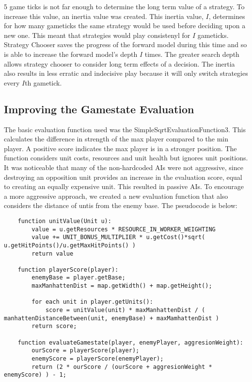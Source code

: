 \documentclass[]{article}
\begin{document}
5 game ticks is not far enough to determine the long term value of a strategy. To increase this value, an inertia value was created. This inertia value, $I$, determines for how many gameticks the same strategy would be used before deciding upon a new one. This meant that strategies would play consistenyl for $I$ gameticks. Strategy Chooser saves the progress of the forward model during this time and so is able to increase the forward model's depth $I$ times. The greater search depth allows strategy chooser to consider long term effects of a decision. The inertia also results in less erratic and indecisive play because it will only switch strategies every $I$th gametick. 

\subsection{Improving the Gamestate Evaluation}
The basic evaluation function used was the SimpleSqrtEvaluationFunction3. This calculates the difference in  strength of the max player compared to the min player. A positive score indicates the max player is in a stronger position. The function considers unit costs, resources and unit health but ignores unit positions. It was noticeable that many of the non-hardcoded AIs were not aggressive, since destroying an opposition unit provides an increase in the evaluation score, equal to creating an equally expensive unit. This resulted in passive AIs. To encourage a more aggressive approach, we created a new evaluation function that also considers the distance of untis from the enemy base. The pseudocode is below:
\begin{lstlisting}
	function unitValue(Unit u):
		value = u.getResources * RESOURCE_IN_WORKER_WEIGHTING
		value += UNIT_BONUS_MULTIPLIER * u.getCost()*sqrt( u.getHitPoints()/u.getMaxHitPoints() )
		return value
		
	function playerScore(player):
		enemyBase = player.getBase;
		maxManhattenDist = map.getWidth() + map.getHeight();
		
		for each unit in player.getUnits():
			score = unitValue(unit) * maxManhattenDist / ( manhattenDistanceBetween(unit, enemyBase) + maxMamhattenDist ) 
		return score;
	
	function evaluateGamestate(player, enemyPlayer, aggresionWeight):
		ourScore = playerScore(player);
		enemyScore = playerScore(enemyPlayer);
		return (2 * ourScore / (ourScore + aggresionWeight * enemyScore) ) - 1;
\end{lstlisting}



\end{document}
